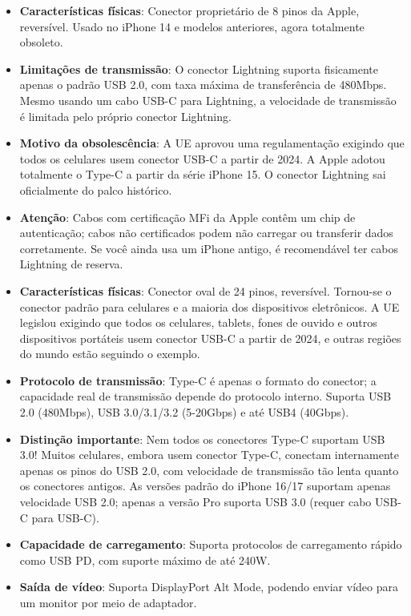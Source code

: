 
\begin{itemize}
  \item \textbf{Características físicas}: Conector proprietário de 8 pinos da Apple, reversível. Usado no iPhone 14 e modelos anteriores, agora totalmente obsoleto.
  \item \textbf{Limitações de transmissão}: O conector Lightning suporta fisicamente apenas o padrão USB 2.0, com taxa máxima de transferência de 480Mbps. Mesmo usando um cabo USB-C para Lightning, a velocidade de transmissão é limitada pelo próprio conector Lightning.
  \item \textbf{Motivo da obsolescência}: A UE aprovou uma regulamentação exigindo que todos os celulares usem conector USB-C a partir de 2024. A Apple adotou totalmente o Type-C a partir da série iPhone 15. O conector Lightning sai oficialmente do palco histórico.
  \item \textbf{Atenção}: Cabos com certificação MFi da Apple contêm um chip de autenticação; cabos não certificados podem não carregar ou transferir dados corretamente. Se você ainda usa um iPhone antigo, é recomendável ter cabos Lightning de reserva.
\end{itemize}


\begin{itemize}
  \item \textbf{Características físicas}: Conector oval de 24 pinos, reversível. Tornou-se o conector padrão para celulares e a maioria dos dispositivos eletrônicos. A UE legislou exigindo que todos os celulares, tablets, fones de ouvido e outros dispositivos portáteis usem conector USB-C a partir de 2024, e outras regiões do mundo estão seguindo o exemplo.
  \item \textbf{Protocolo de transmissão}: Type-C é apenas o formato do conector; a capacidade real de transmissão depende do protocolo interno. Suporta USB 2.0 (480Mbps), USB 3.0/3.1/3.2 (5-20Gbps) e até USB4 (40Gbps).
  \item \textbf{Distinção importante}: Nem todos os conectores Type-C suportam USB 3.0! Muitos celulares, embora usem conector Type-C, conectam internamente apenas os pinos do USB 2.0, com velocidade de transmissão tão lenta quanto os conectores antigos. As versões padrão do iPhone 16/17 suportam apenas velocidade USB 2.0; apenas a versão Pro suporta USB 3.0 (requer cabo USB-C para USB-C).
  \item \textbf{Capacidade de carregamento}: Suporta protocolos de carregamento rápido como USB PD, com suporte máximo de até 240W.
  \item \textbf{Saída de vídeo}: Suporta DisplayPort Alt Mode, podendo enviar vídeo para um monitor por meio de adaptador.
\end{itemize}

